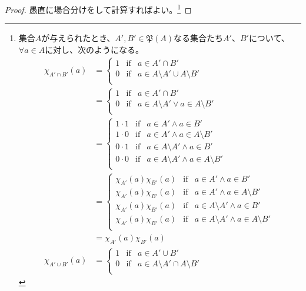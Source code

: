 \documentclass[dvipdfmx]{jsarticle}
\begin{document}
\begin{proof}
愚直に場合分けをして計算すればよい。\footnote{
集合$A$が与えられたとき、$A',B'\in \mathfrak{P}(A)$なる集合たち$A'$、$B'$について、$\forall a \in A$に対し、次のようになる。
\begin{align*}
\chi_{A' \cap B'}(a) &= \left\{ \begin{matrix}
1 & {\mathrm{if}} & a \in A' \cap B' \\
0 & {\mathrm{if}} & a \in A \setminus A' \cup A \setminus B' \\
\end{matrix} \right.\ \\
&= \left\{ \begin{matrix}
1 & {\mathrm{if}} & a \in A' \cap B' \\
0 & {\mathrm{if}} & a \in A \setminus A' \vee a \in A \setminus B' \\
\end{matrix} \right.\ \\
&= \left\{ \begin{matrix}
1 \cdot 1 & {\mathrm{if}} & a \in A' \land a \in B' \\
1 \cdot 0 & {\mathrm{if}} & a \in A' \land a \in A \setminus B' \\
0 \cdot 1 & {\mathrm{if}} & a \in A \setminus A' \land a \in B' \\
0 \cdot 0 & {\mathrm{if}} & a \in A \setminus A' \land a \in A \setminus B' \\
\end{matrix} \right.\ \\
&= \left\{ \begin{matrix}
\chi_{A'}(a)\chi_{B'}(a) & {\mathrm{if}} & a \in A' \land a \in B' \\
\chi_{A'}(a)\chi_{B'}(a) & {\mathrm{if}} & a \in A' \land a \in A \setminus B' \\
\chi_{A'}(a)\chi_{B'}(a) & {\mathrm{if}} & a \in A \setminus A' \land a \in B' \\
\chi_{A'}(a)\chi_{B'}(a) & {\mathrm{if}} & a \in A \setminus A' \land a \in A \setminus B' \\
\end{matrix} \right.\ \\
&= \chi_{A'}(a)\chi_{B'}(a) \\
\chi_{A' \cup B'}(a) &= \left\{ \begin{matrix}
1 & {\mathrm{if}} & a \in A' \cup B' \\
0 & {\mathrm{if}} & a \in A \setminus A' \cap A \setminus B' \\

\end{matrix}
\end{align*}}
\end{proof}
\end{document}
